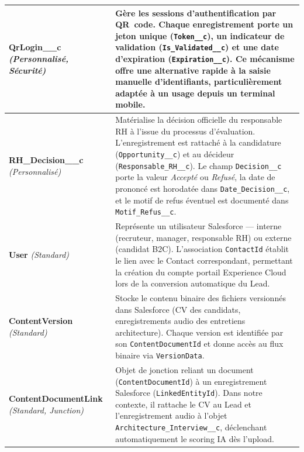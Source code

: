 \begin{longtable}{|p{4.2cm}|p{10.8cm}|}
\textbf{QrLogin\_\_c} \newline\textit{(Personnalisé, Sécurité)} & Gère les sessions d'authentification par QR~code. Chaque enregistrement porte un jeton unique (\texttt{Token\_\_c}), un indicateur de validation (\texttt{Is\_Validated\_\_c}) et une date d'expiration (\texttt{Expiration\_\_c}). Ce mécanisme offre une alternative rapide à la saisie manuelle d'identifiants, particulièrement adaptée à un usage depuis un terminal mobile. \\
\hline

\textbf{RH\_Decision\_\_c} \newline\textit{(Personnalisé)} & Matérialise la décision officielle du responsable RH à l'issue du processus d'évaluation. L'enregistrement est rattaché à la candidature (\texttt{Opportunity\_\_c}) et au décideur (\texttt{Responsable\_RH\_\_c}). Le champ \texttt{Decision\_\_c} porte la valeur \textit{Accepté} ou \textit{Refusé}, la date de prononcé est horodatée dans \texttt{Date\_Decision\_\_c}, et le motif de refus éventuel est documenté dans \texttt{Motif\_Refus\_\_c}. \\
\hline

\textbf{User} \newline\textit{(Standard)} & Représente un utilisateur Salesforce --- interne (recruteur, manager, responsable RH) ou externe (candidat B2C). L'association \texttt{ContactId} établit le lien avec le Contact correspondant, permettant la création du compte portail Experience Cloud lors de la conversion automatique du Lead. \\
\hline

\textbf{ContentVersion} \newline\textit{(Standard)} & Stocke le contenu binaire des fichiers versionnés dans Salesforce (CV des candidats, enregistrements audio des entretiens architecture). Chaque version est identifiée par son \texttt{ContentDocumentId} et donne accès au flux binaire via \texttt{VersionData}. \\
\hline

\textbf{ContentDocumentLink} \newline\textit{(Standard, Junction)} & Objet de jonction reliant un document (\texttt{ContentDocumentId}) à un enregistrement Salesforce (\texttt{LinkedEntityId}). Dans notre contexte, il rattache le CV au Lead et l'enregistrement audio à l'objet \texttt{Architecture\_Interview\_\_c}, déclenchant automatiquement le scoring IA dès l'upload. \\
\hline


\end{longtable}
